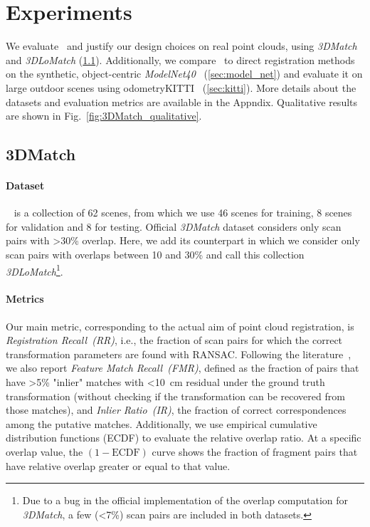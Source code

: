 \section{Experiments}
\label{sec:experiments}
We evaluate \acro\ and justify our design choices on real point clouds, using \emph{3DMatch}~\cite{zeng20163dmatch} and \emph{3DLoMatch} (\cref{sec:3DMatch}). Additionally, we compare \acro\ to direct registration methods on the synthetic, object-centric \emph{ModelNet40}~\cite{wu2015ModelNet} (\cref{sec:model_net}) and evaluate it on large outdoor scenes using odometryKITTI~\cite{geiger2012kitti} (\cref{sec:kitti}). More details about the datasets and evaluation metrics are available in the Appndix. Qualitative results are shown in Fig.~\ref{fig:3DMatch_qualitative}.


\subsection{3DMatch}
\label{sec:3DMatch}
\paragraph{Dataset}
~\cite{zeng20163dmatch} is a collection of 62 scenes, from which we use 46 scenes for training, 8 scenes for validation and 8 for testing. Official \emph{3DMatch} dataset considers only scan pairs with \textgreater30\% overlap. Here, we add its counterpart in which we consider only scan pairs with overlaps between 10 and 30\% and call this collection \textit{3DLoMatch}\footnote{Due to a bug in the official implementation of the overlap computation for \emph{3DMatch}, a few (\textless7\%) scan pairs are included in both datasets.}. 

\paragraph{Metrics}
Our main metric, corresponding to the actual aim of point cloud registration, is \emph{Registration Recall~(RR)}, i.e., the fraction of scan pairs for which the correct transformation parameters are found with RANSAC.
Following the literature~\cite{zeng20163dmatch, gojcic2018learned, Choy2019FCGF}, we also report 
\emph{Feature Match Recall~(FMR)}, defined as the fraction of pairs 
that have \textgreater5\% "inlier" matches with \textless10~cm residual under the ground truth transformation (without checking if the transformation can be recovered from those matches), and \emph{Inlier Ratio~(IR)}, the fraction of correct correspondences among the putative matches. Additionally, we use empirical cumulative distribution functions (ECDF) to evaluate the relative overlap ratio. At a specific overlap value, the $(1\!-\!\text{ECDF})$ curve shows the fraction of fragment pairs that have relative overlap greater or equal to that value.

